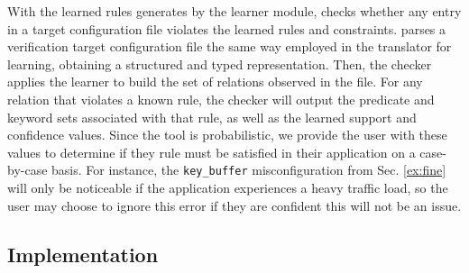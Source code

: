 With the learned rules generates by the learner module,
  \app checks whether any entry in a target configuration file violates the learned rules and constraints.
\app parses a verification target configuration file the same way employed in the translator for learning,
  obtaining a structured and typed representation.
Then, the checker applies the learner to build the set of relations observed in the file.
For any relation that violates a known rule, the checker will output the predicate and keyword sets associated with that rule, as well as the learned support and confidence values.
Since the tool is probabilistic, we provide the user with these values to determine if they rule must be satisfied in their application on a case-by-case basis.
For instance, the \texttt{key\_buffer} misconfiguration from Sec. \ref{ex:fine} will only be noticeable if the application experiences a heavy traffic load, so the user may choose to ignore this error if they are confident this will not be an issue.


\subsection{Implementation}


